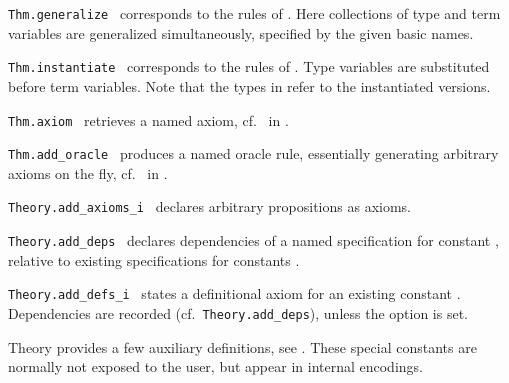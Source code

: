 \begin{isabellebody}
\begin{isamarkuptext}
\begin{description}
  \item \verb|Thm.generalize|~
  corresponds to the  rules of
  .  Here collections of type and term
  variables are generalized simultaneously, specified by the given
  basic names.

  \item \verb|Thm.instantiate|~ corresponds to the  rules
  of .  Type variables are substituted before
  term variables.  Note that the types in 
  refer to the instantiated versions.

  \item \verb|Thm.axiom|~ retrieves a named
  axiom, cf.\  in .

  \item \verb|Thm.add_oracle|~ produces a named
  oracle rule, essentially generating arbitrary axioms on the fly,
  cf.\  in .

  \item \verb|Theory.add_axioms_i|~ declares
  arbitrary propositions as axioms.

  \item \verb|Theory.add_deps|~ declares dependencies of a named specification
  for constant , relative to existing
  specifications for constants .

  \item \verb|Theory.add_defs_i|~ states a definitional axiom for an existing
  constant .  Dependencies are recorded (cf.\ \verb|Theory.add_deps|), unless the  option is set.

  \end{description}%
\end{isamarkuptext}%
\isamarkuptrue%
%
\endisatagmlref
{\isafoldmlref}%
%
\isadelimmlref
%
\endisadelimmlref
%
\isamarkuptrue%
%
\begin{isamarkuptext}%
Theory  provides a few auxiliary definitions, see
  .  These special constants are normally not
  exposed to the user, but appear in internal encodings.


\end{isamarkuptext}
\end{isabellebody}
